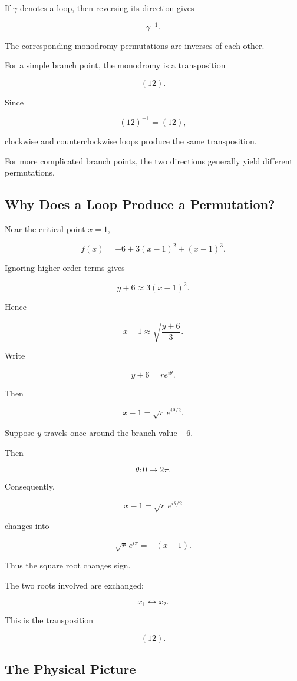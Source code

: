 \documentclass[12pt,a4paper]{article}
\theoremstyle{notespace}
\begin{document}
If \(\gamma\) denotes a loop, then reversing its direction gives

\[
\gamma^{-1}.
\]

The corresponding monodromy permutations are inverses of each other.

For a simple branch point, the monodromy is a transposition

\[
(12).
\]

Since

\[
(12)^{-1}
=
(12),
\]

clockwise and counterclockwise loops produce the same transposition.

For more complicated branch points, the two directions generally yield
different permutations.

\subsection{Why Does a Loop Produce a Permutation?}

Near the critical point \(x=1\),

\[
f(x)
=
-6
+
3(x-1)^2
+
(x-1)^3.
\]

Ignoring higher-order terms gives

\[
y+6
\approx
3(x-1)^2.
\]

Hence

\[
x-1
\approx
\sqrt{\frac{y+6}{3}}.
\]

Write

\[
y+6
=
re^{i\theta}.
\]

Then

\[
x-1
=
\sqrt r\, e^{i\theta/2}.
\]

Suppose \(y\) travels once around the branch value \(-6\).

Then

\[
\theta
:
0
\longrightarrow
2\pi.
\]

Consequently,

\[
x-1
=
\sqrt r\,e^{i\theta/2}
\]

changes into

\[
\sqrt r\,e^{i\pi}
=
-(x-1).
\]

Thus the square root changes sign.

The two roots involved are exchanged:

\[
x_1
\longleftrightarrow
x_2.
\]

This is the transposition

\[
(12).
\]

\subsection{The Physical Picture}
\end{document}
